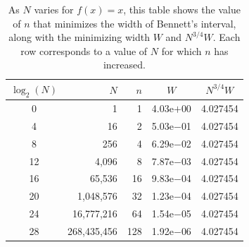\documentclass{article}
\newcommand{\art}[1]{\begingroup\color{blue}#1\endgroup}
\newcommand{\aadit}[1]{\begingroup\color{orange}#1\endgroup}
\newcommand{\phz}{\phantom{0}}
\begin{document}
\begin{table}\centering
\begin{tabular}{crrcc}
\toprule
      $\log_2(N)$&        $N$ &  $n$ & $W$ & $N^{3/4}W$\\
\midrule
  \phz0&         1 &  1 &4.03e$+$00 &4.027454\\
  \phz4&        16 &  2 &5.03e$-$01 &4.027454\\
  \phz8&       256 &  4 &6.29e$-$02 &4.027454\\
 12&      4,096 &  8 &7.87e$-$03 &4.027454\\
 16&     65,536 & 16 &9.83e$-$04 &4.027454\\
 20&   1,048,576 & 32 &1.23e$-$04 &4.027454\\
 24&  16,777,216 & 64 &1.54e$-$05 &4.027454\\
 28& 268,435,456 &128 &1.92e$-$06 &4.027454\\
 \bottomrule
\end{tabular}
\caption{\label{tab:smoothcase}
As $N$ varies for $f(x)=x$, this table shows the
value of $n$ that minimizes the width of Bennett's
interval, along with the minimizing width $W$
and $N^{3/4}W$. Each row corresponds to a value of $N$
for which $n$ has increased.}
\end{table}








\end{document}
